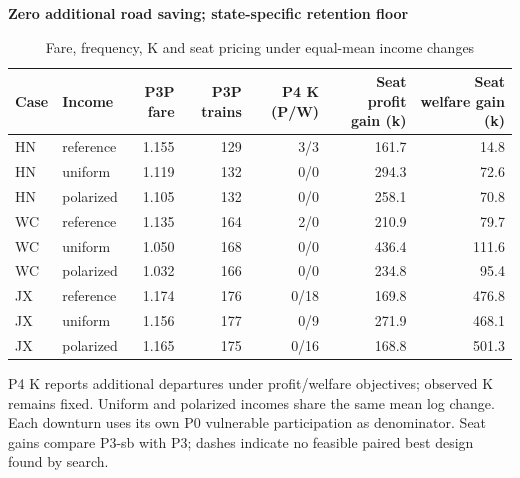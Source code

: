 \begin{table}[htbp]\centering
\caption{Fare, frequency, K and seat pricing under equal-mean income changes}\label{tab:round2_polarization}
\begin{minipage}{.95\textwidth}\fontsize{8}{10}\selectfont{}\setlength{\tabcolsep}{2pt}\renewcommand{\arraystretch}{1.08}
\par\noindent\textbf{Zero additional road saving; state-specific retention floor}\par\smallskip
\begin{tabular*}{\linewidth}{@{\extracolsep{\fill}}llrrrrr@{}}\toprule
Case & Income & P3P fare & P3P trains & P4 K (P/W) & Seat profit gain (k) & Seat welfare gain (k) \\
\midrule
HN & reference & 1.155 & 129 & 3/3 & 161.7 & 14.8 \\
HN & uniform & 1.119 & 132 & 0/0 & 294.3 & 72.6 \\
HN & polarized & 1.105 & 132 & 0/0 & 258.1 & 70.8 \\
WC & reference & 1.135 & 164 & 2/0 & 210.9 & 79.7 \\
WC & uniform & 1.050 & 168 & 0/0 & 436.4 & 111.6 \\
WC & polarized & 1.032 & 166 & 0/0 & 234.8 & 95.4 \\
JX & reference & 1.174 & 176 & 0/18 & 169.8 & 476.8 \\
JX & uniform & 1.156 & 177 & 0/9 & 271.9 & 468.1 \\
JX & polarized & 1.165 & 175 & 0/16 & 168.8 & 501.3 \\
\bottomrule\end{tabular*}\par\medskip
\par\noindent\fontsize{8}{9.5}\selectfont P4 K reports additional departures under profit/welfare objectives; observed K remains fixed. Uniform and polarized incomes share the same mean log change. Each downturn uses its own P0 vulnerable participation as denominator. Seat gains compare P3-sb with P3; dashes indicate no feasible paired best design found by search.
\end{minipage}\end{table}
